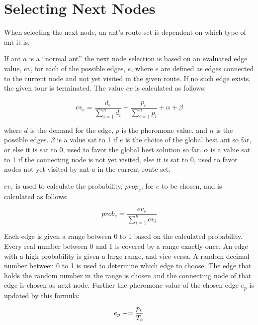 \section{Selecting Next Nodes}
\label{sec:selectingNextNode}

When selecting the next node, an ant's route set is dependent on which type of ant it is. 

If ant $a$ is a ``normal ant'' the next node selection is based on an evaluated edge value, $ev$, for each of the possible edges, $e$, where $e$ are defined as edges connected to the current node and not yet visited in the given route. If no such edge exists, the given tour is terminated. %
The value $ev$ is calculated as follows: 

$$ev_e = \frac{d_e}{\sum\limits^{n}_{i=1}d_i} + \frac{p_e}{\sum\limits^{n}_{i=1}p_i} + \alpha + \beta$$

where $d$ is the demand for the edge, $p$ is the pheromone value, and $n$ is the possible edges. $\beta$ is a value sat to 1 if $e$ is the choice of the global best ant so far, or else it is sat to 0, used to favor the global best solution so far. %
$\alpha$ is a value sat to 1 if the connecting node is not yet visited, else it is sat to 0, used to favor nodes not yet visited by ant $a$ in the current route set.  

$ev_e$ is used to calculate the probability, $prop_e$, for $e$ to be chosen, and is calculated as follows:

$$prob_e = \frac{ev_e}{\sum\limits^{n}_{i=1}ev_i}$$

Each edge is given a range between 0 to 1 based on the calculated probability. Every real number between 0 and 1 is covered by a range exactly once. An edge with a high probability is given a large range, and vice versa. A random decimal number between 0 to 1 is used to determine which edge to choose. The edge that holds the random number in the range is chosen and the connecting node of that edge is chosen as next node. Further the pheromone value of the chosen edge $e_p$ is updated by this formula:

$$e_p \mathrel{+}= \frac{p_v}{T_e}$$ 

